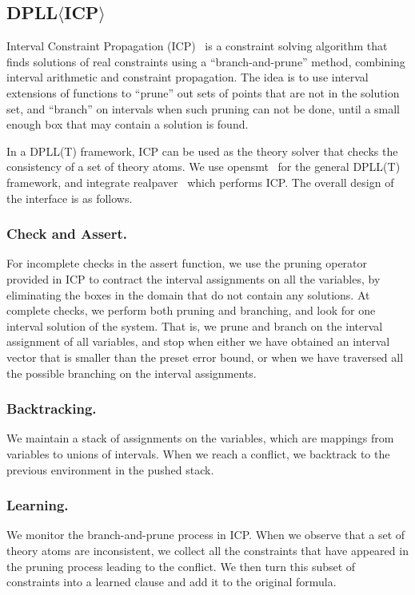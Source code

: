 \documentclass[envcountsect]{llncs}
\begin{document}
\subsection{DPLL$\langle$ICP$\rangle$}

Interval Constraint Propagation (ICP)~\cite{handbookICP} is a constraint solving
algorithm that finds
solutions of real constraints using a ``branch-and-prune'' method, combining
interval arithmetic and constraint propagation. The idea is to use interval
extensions of functions to ``prune'' out sets of points that are not in the
solution set, and ``branch'' on intervals when such pruning can not be done,
until a small enough box that may contain a solution is found.

In a DPLL(T) framework, ICP can be used as the theory solver that checks the
consistency of a set of theory atoms. We use
{\sf opensmt}~\cite{DBLP:conf/tacas/BruttomessoPST10} for the
general
DPLL(T) framework, and integrate {\sf realpaver}~\cite{DBLP:journals/toms/GranvilliersB06} which performs ICP. The
overall design of the interface is as follows.
\subsubsection{Check and Assert.} For incomplete checks in the assert function,
we use the pruning operator provided in ICP to contract the interval assignments
on all the variables, by eliminating the boxes in the domain that do not contain
any solutions. At complete checks, we perform both pruning and branching, and
look for one interval solution of the system. That is, we prune and branch on
the interval assignment of all variables, and stop when either we have obtained
an interval vector that is smaller than the preset error bound, or when we have
traversed all the possible branching on the interval assignments.
\subsubsection{Backtracking.} We maintain a stack of assignments on the variables,
which are mappings from variables to unions of intervals. When we reach a
conflict, we backtrack to the previous environment in the pushed stack.
\subsubsection{Learning.} We monitor the branch-and-prune process in ICP.
When we observe that a set of theory atoms are inconsistent, we collect all the
constraints that have appeared in the pruning process leading to the conflict.
We then turn this subset of constraints into a learned clause and add it to the
original formula.
\end{document}
